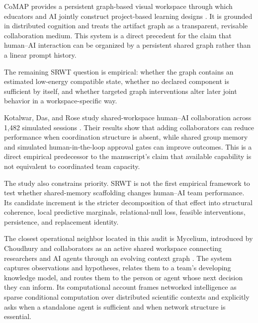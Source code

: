 CoMAP provides a persistent graph-based visual workspace through which
educators and AI jointly construct project-based learning designs
\cite{LiJiang2026}. It is grounded in distributed cognition and treats the
artifact graph as a transparent, revisable collaboration medium. This system
is a direct precedent for the claim that human--AI interaction can be organized
by a persistent shared graph rather than a linear prompt history.

The remaining SRWT question is empirical: whether the graph contains an
estimated low-energy compatible state, whether no declared component is
sufficient by itself, and whether targeted graph interventions alter later
joint behavior in a workspace-specific way.


Kotalwar, Das, and Rose study shared-workspace human--AI collaboration across
1,482 simulated sessions \cite{KotalwarDasRose2026}. Their results show that
adding collaborators can reduce performance when coordination structure is
absent, while shared group memory and simulated human-in-the-loop approval
gates can improve outcomes. This is a direct empirical predecessor to the
manuscript's claim that available capability is not equivalent to coordinated
team capacity.

The study also constrains priority. SRWT is not the first empirical framework
to test whether shared-memory scaffolding changes human--AI team performance.
Its candidate increment is the stricter decomposition of that effect into
structural coherence, local predictive marginals, relational-null loss,
feasible interventions, persistence, and replacement identity.


The closest operational neighbor located in this audit is Mycelium, introduced
by Choudhury and collaborators as an active shared workspace connecting
researchers and AI agents through an evolving context graph
\cite{ChoudhuryEtAl2026}. The system captures observations and hypotheses,
relates them to a team's developing knowledge model, and routes them to the
person or agent whose next decision they can inform. Its computational account
frames networked intelligence as sparse conditional computation over
distributed scientific contexts and explicitly asks when a standalone agent is
sufficient and when network structure is essential.

